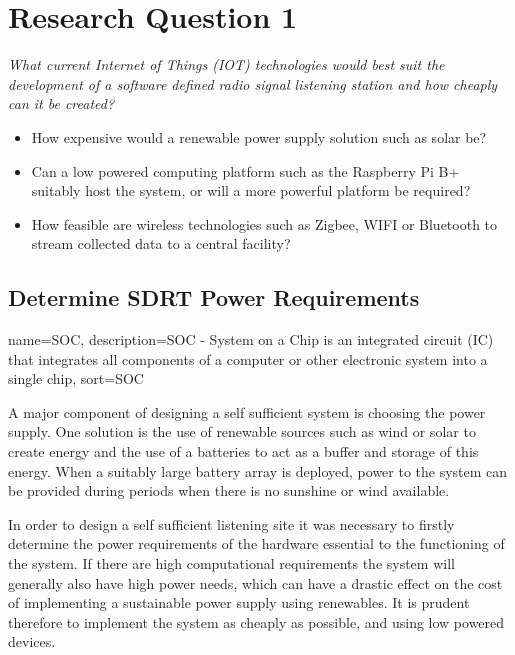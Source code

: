 \newpage
\chapter*{Research Question 1}

\textit{What current Internet of Things (\gls{IOT}) technologies would best suit the development of a software defined radio signal listening station and how cheaply can it be created?}

\begin{itemize}
	\item How expensive would a renewable power supply solution such as solar be?
	\item Can a low powered computing platform such as the Raspberry Pi B+ suitably host the system, or will a more powerful platform be required?
	\item How feasible are wireless technologies such as Zigbee, WIFI or Bluetooth to stream collected data to a central facility?
\end{itemize}


\section*{Determine SDRT Power Requirements}

{
	name={SOC},
	description={SOC - System on a Chip is an integrated circuit (IC) that integrates all components of a computer or other electronic system into a single chip},
	sort=SOC
}

A major component of designing a self sufficient system is choosing the power supply. One solution is the use of renewable sources such as wind or solar to create energy and the use of a batteries to act as a buffer and storage of this energy. When a suitably large battery array is deployed, power to the system can be provided during periods when there is no sunshine or wind available.

In order to design a self sufficient listening site it was necessary to firstly determine the power requirements of the hardware essential to the functioning of the system. If there are high computational requirements the system will generally also have high power needs, which can have a drastic effect on the cost of implementing a sustainable power supply using renewables. It is prudent therefore to implement the system as cheaply as possible, and using low powered devices.


